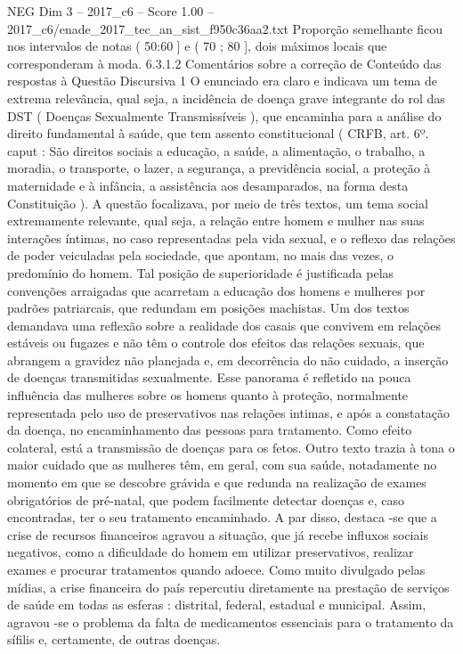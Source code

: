 \begin{textsample}{NEG Dim 3 – 2017\_c6 – Score 1.00 – 2017\_c6/enade\_2017\_tec\_an\_sist\_f950c36aa2.txt}
Proporção semelhante ficou nos intervalos de notas ( 50:60 ] e ( 70 ; 80 ], dois máximos locais que corresponderam à moda. 6.3.1.2 Comentários sobre a correção de Conteúdo das respostas à Questão Discursiva 1 O enunciado era claro e indicava um tema de extrema relevância, qual seja, a incidência de doença grave integrante do rol das DST ( Doenças Sexualmente Transmissíveis ), que encaminha para a análise do direito fundamental à saúde, que tem assento constitucional ( CRFB, art. 6º. caput : São direitos sociais a educação, a saúde, a alimentação, o trabalho, a moradia, o transporte, o lazer, a segurança, a previdência social, a proteção à maternidade e à infância, a assistência aos desamparados, na forma desta Constituição ).
A questão focalizava, por meio de três textos, um tema social extremamente relevante, qual seja, a relação entre homem e mulher nas suas interações íntimas, no caso representadas pela vida sexual, e o reflexo das relações de poder veiculadas pela sociedade, que apontam, no mais das vezes, o predomínio do homem.
Tal posição de superioridade é justificada pelas convenções arraigadas que acarretam a educação dos homens e mulheres por padrões patriarcais, que redundam em posições machistas.
Um dos textos demandava uma reflexão sobre a realidade dos casais que convivem em relações estáveis ou fugazes e não têm o controle dos efeitos das relações sexuais, que abrangem a gravidez não planejada e, em decorrência do não cuidado, a inserção de doenças transmitidas sexualmente.
Esse panorama é refletido na pouca influência das mulheres sobre os homens quanto à proteção, normalmente representada pelo uso de preservativos nas relações intimas, e após a constatação da doença, no encaminhamento das pessoas para tratamento.
Como efeito colateral, está a transmissão de doenças para os fetos.
Outro texto trazia à tona o maior cuidado que as mulheres têm, em geral, com sua saúde, notadamente no momento em que se descobre grávida e que redunda na realização de exames obrigatórios de pré-natal, que podem facilmente detectar doenças e, caso encontradas, ter o seu tratamento encaminhado.
A par disso, destaca -se que a crise de recursos financeiros agravou a situação, que já recebe influxos sociais negativos, como a dificuldade do homem em utilizar preservativos, realizar exames e procurar tratamentos quando adoece.
Como muito divulgado pelas mídias, a crise financeira do país repercutiu diretamente na prestação de serviços de saúde em todas as esferas : distrital, federal, estadual e municipal.
Assim, agravou -se o problema da falta de medicamentos essenciais para o tratamento da sífilis e, certamente, de outras doenças.

\end{textsample}
